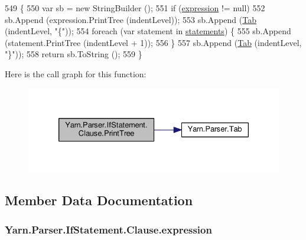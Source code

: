 \begin{DoxyCode}
549                                                            \{
550                     var sb = \textcolor{keyword}{new} StringBuilder ();
551                     \textcolor{keywordflow}{if} (\hyperlink{a00044_a1abd1f7c41f68ccdf64074ea49365be9}{expression} != null)
552                         sb.Append (expression.PrintTree (indentLevel));
553                     sb.Append (\hyperlink{a00143_aa8fa36b46de12a1c561d77b99c4b9ae3}{Tab} (indentLevel, \textcolor{stringliteral}{"\{"}));
554                     \textcolor{keywordflow}{foreach} (var statement \textcolor{keywordflow}{in} \hyperlink{a00044_a6f4765482e98ed042e38a0ede13f171f}{statements}) \{
555                         sb.Append (statement.PrintTree (indentLevel + 1));
556                     \}
557                     sb.Append (\hyperlink{a00143_aa8fa36b46de12a1c561d77b99c4b9ae3}{Tab} (indentLevel, \textcolor{stringliteral}{"\}"}));
558                     \textcolor{keywordflow}{return} sb.ToString ();
559                 \}
\end{DoxyCode}


Here is the call graph for this function\-:
\nopagebreak
\begin{figure}[H]
\begin{center}
\leavevmode
\includegraphics[width=330pt]{a00044_a7f4fc9399896512b68fdc7bc7cf818c9_cgraph}
\end{center}
\end{figure}




\subsection{Member Data Documentation}
\hypertarget{a00044_a1abd1f7c41f68ccdf64074ea49365be9}{
\subsubsection[{expression}]{ Yarn.\-Parser.\-If\-Statement.\-Clause.\-expression\hspace{0.3cm}{\ttfamily [package]}}}\label{a00044_a1abd1f7c41f68ccdf64074ea49365be9}


